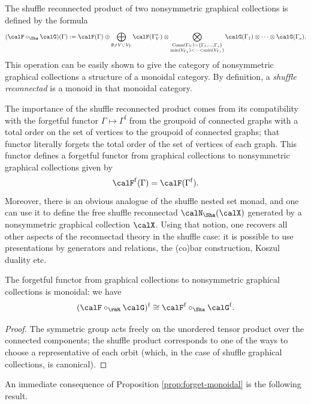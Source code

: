 The shuffle reconnected product of two nonsymmetric graphical collections is defined by the formula
  \[
(\calF\circ_{\Sha}\calG)(\Gamma):=\calF(\Gamma)\oplus\bigoplus_{\emptyset\neq V\subset V_\Gamma}\calF(\Gamma^*_V)\otimes
\bigotimes_{\substack{\mathrm{Conn}(\Gamma_V)=\{\Gamma_1,\ldots,\Gamma_s\}\\ \min (V_{\Gamma_1})<\cdots<\min (V_{\Gamma_s})}} \calG(\Gamma_1)\otimes\cdots\otimes\calG(\Gamma_s).
 \]
This operation can be easily shown to give the category of nonsymmetric graphical collections a structure of a monoidal category. By definition, a \emph{shuffle reconnectad} is a monoid in that monoidal category. 

The importance of the shuffle reconnected product comes from its compatibility with the forgetful functor $\Gamma \mapsto \Gamma^{\mathrm{f}}$ from the groupoid of connected graphs with a total order on the set of vertices to the groupoid of connected graphs; that functor literally forgets the total order of the set of vertices of each graph. This functor defines a forgetful functor from graphical collections to nonsymmetric graphical collections given by 
 \[
\calF^{\mathrm{f}}(\Gamma)=\calF(\Gamma^{\mathrm{f}}).
 \]  
Moreover, there is an obvious analogue of the shuffle nested set monad, and one can use it to define the free shuffle reconnectad $\calN_{\Sha}(\calX)$ generated by a nonsymmetric graphical collection $\calX$. Using that notion, one recovers all other aspects of the reconnectad theory in the shuffle case: it is possible to use presentations by generators and relations, the (co)bar construction, Koszul duality etc.

\begin{prop}\label{prop:forget-monoidal}
The forgetful functor from graphical collections to nonsymmetric graphical collections is monoidal: we have
 \[
(\calF\circ_{\rmR}\calG)^{\mathrm{f}}\cong \calF^{\mathrm{f}}\circ_{\Sha}\calG^{\mathrm{f}}.
 \]
\end{prop}

\begin{proof}
The symmetric group acts freely on the unordered tensor product over the connected components; the shuffle product corresponds to one of the ways 
to choose a representative of each orbit (which, in the case of shuffle graphical collections, is canonical).
\end{proof}

An immediate consequence of Proposition \ref{prop:forget-monoidal} is the following result. 

